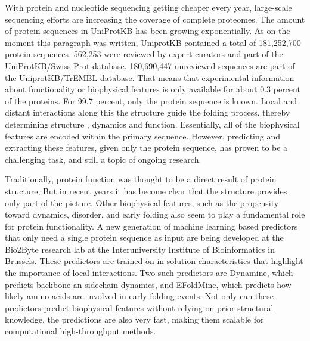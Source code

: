 With protein and nucleotide sequencing getting cheaper every year, 
large-scale sequencing efforts are increasing the coverage of complete proteomes.
The amount of protein sequences in UniProtKB has been growing exponentially.
As on the moment this paragraph was written, 
UniprotKB contained a total of 181,252,700 protein sequences. 
562,253 were reviewed by expert curators and part of the UniProtKB/Swiss-Prot database.
180,690,447 unreviewed sequences are part of the UniprotKB/TrEMBL database. 
That means that experimental information about functionality or biophysical features is only available for about 0.3 percent of the proteins.
For 99.7 percent, only the protein sequence is known.
Local and distant interactions along this the structure guide the folding process,
thereby determining structure , dynamics and function.
Essentially, all of the biophysical features are encoded within the primary sequence.
However, predicting and extracting these features, given only the protein sequence, has proven to be a challenging task,
and still a topic of ongoing research.

Traditionally, protein function was thought to be a direct result of protein structure,
But in recent years it has become clear that the structure provides only part of the picture.
Other biophysical features, such as the propensity toward dynamics, disorder, and early folding also seem to play a fundamental role for protein functionality.
A new generation of machine learning based predictors that only need a single protein sequence as input
are being developed at the Bio2Byte research lab at the Interuniversity Institute of Bioinformatics in Brussels.
These predictors are trained on in-solution characteristics that highlight the importance of local interactions.
Two such predictors are Dynamine, which predicts backbone an sidechain dynamics,
and EFoldMine, which predicts how likely amino acids are involved in early folding events.
Not only can these predictors predict biophysical features without relying on prior structural knowledge,
the predictions are also very fast,
making them scalable for computational high-throughput methods.

